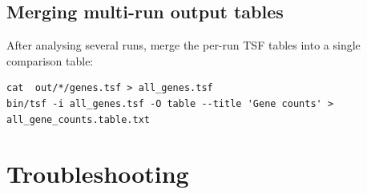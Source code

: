 \documentclass[11pt]{article}
\begin{document}
\subsection{Merging multi-run output tables}

After analysing several runs, merge the per-run TSF tables into a
single comparison table:
\begin{lstlisting}
cat  out/*/genes.tsf > all_genes.tsf
bin/tsf -i all_genes.tsf -O table --title 'Gene counts' > all_gene_counts.table.txt
\end{lstlisting}

\section{Troubleshooting}
\end{document}
